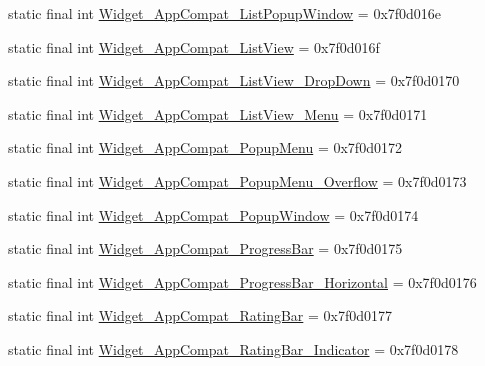 \begin{DoxyCompactItemize}
\item 
static final int \mbox{\hyperlink{classandroid_1_1support_1_1design_1_1R_1_1style_ad8f90fca8c6fe4f82764d8c71e26cc9e}{Widget\+\_\+\+App\+Compat\+\_\+\+List\+Popup\+Window}} = 0x7f0d016e
\item 
static final int \mbox{\hyperlink{classandroid_1_1support_1_1design_1_1R_1_1style_a9ccf0592624b31bfc316c13457666037}{Widget\+\_\+\+App\+Compat\+\_\+\+List\+View}} = 0x7f0d016f
\item 
static final int \mbox{\hyperlink{classandroid_1_1support_1_1design_1_1R_1_1style_ab67dfc2e7a77263ca823b0590eda7828}{Widget\+\_\+\+App\+Compat\+\_\+\+List\+View\+\_\+\+Drop\+Down}} = 0x7f0d0170
\item 
static final int \mbox{\hyperlink{classandroid_1_1support_1_1design_1_1R_1_1style_aa09a8e109ec40dc7c46cc3840732d1f8}{Widget\+\_\+\+App\+Compat\+\_\+\+List\+View\+\_\+\+Menu}} = 0x7f0d0171
\item 
static final int \mbox{\hyperlink{classandroid_1_1support_1_1design_1_1R_1_1style_a5be61913be313ee9343c327d6a484a45}{Widget\+\_\+\+App\+Compat\+\_\+\+Popup\+Menu}} = 0x7f0d0172
\item 
static final int \mbox{\hyperlink{classandroid_1_1support_1_1design_1_1R_1_1style_a575cc5a614049c69898d8e1cdc96eed5}{Widget\+\_\+\+App\+Compat\+\_\+\+Popup\+Menu\+\_\+\+Overflow}} = 0x7f0d0173
\item 
static final int \mbox{\hyperlink{classandroid_1_1support_1_1design_1_1R_1_1style_ad01cd09f11b7b01c4e2e498efaf849f4}{Widget\+\_\+\+App\+Compat\+\_\+\+Popup\+Window}} = 0x7f0d0174
\item 
static final int \mbox{\hyperlink{classandroid_1_1support_1_1design_1_1R_1_1style_a5ec9d21fb8b380e4d5dd750b5c18154a}{Widget\+\_\+\+App\+Compat\+\_\+\+Progress\+Bar}} = 0x7f0d0175
\item 
static final int \mbox{\hyperlink{classandroid_1_1support_1_1design_1_1R_1_1style_aa2e12a70a393c57a17d369b1e609d364}{Widget\+\_\+\+App\+Compat\+\_\+\+Progress\+Bar\+\_\+\+Horizontal}} = 0x7f0d0176
\item 
static final int \mbox{\hyperlink{classandroid_1_1support_1_1design_1_1R_1_1style_a5040616cea8d7da82220110548051e50}{Widget\+\_\+\+App\+Compat\+\_\+\+Rating\+Bar}} = 0x7f0d0177
\item 
static final int \mbox{\hyperlink{classandroid_1_1support_1_1design_1_1R_1_1style_a9a623e13544be7d8bed9790bc60d7d26}{Widget\+\_\+\+App\+Compat\+\_\+\+Rating\+Bar\+\_\+\+Indicator}} = 0x7f0d0178
\item 

\end{DoxyCompactItemize}
